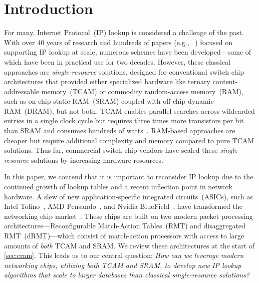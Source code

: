 
\section{Introduction}
\label{sec:introduction}

For many, Internet Protocol~(IP) lookup is considered a challenge of the past. With over 40 years of research and hundreds of papers (e.g., ~\cite{dir, lulea, lampson, dxr, tree_bitmap, dharma, poptrie, hibst, sail}) focused on supporting IP lookup at scale, numerous schemes have been developed---some of which have been in practical use for two decades. However, these classical approaches are {\em single-resource} solutions, designed for conventional switch chip architectures that provided either specialized hardware like ternary content-addressable memory~(TCAM) or commodity random-access memory~(RAM), such as on-chip static RAM~(SRAM) coupled with off-chip dynamic RAM~(DRAM), but not both. TCAM enables parallel searches across wildcarded entries in a single clock cycle but requires three times more transistors per bit than SRAM and consumes hundreds of watts~\cite{tcampower}. RAM-based approaches are cheaper but require additional complexity and memory compared to pure TCAM solutions. Thus far, commercial switch chip vendors have scaled these {\em single-resource} solutions by increasing hardware resources.

In this paper, we contend that it is important to reconsider IP lookup due to the continued growth of lookup tables and a recent inflection point in network hardware. A slew of new application-specific integrated circuits~(ASICs), such as Intel Tofino~\cite{intel_tofino}, AMD Pensando~\cite{amd_pensando}, and Nvidia BlueField~\cite{nvidia_bluefield}, have transformed the networking chip market~\cite{p4_ecosystem}. These chips are built on two modern packet processing architectures---Reconfigurable Match-Action Tables~(RMT)\cite{rmt} and disaggregated RMT~(dRMT)\cite{drmt}---which consist of match-action processors with access to large amounts of {\em both} TCAM and SRAM. We review these architectures at the start of \cref{sec:cram}. This leads us to our central question: \textit{How can we leverage modern networking chips, utilizing both TCAM and SRAM, to develop new IP lookup algorithms that scale to larger databases than classical single-resource solutions?}

